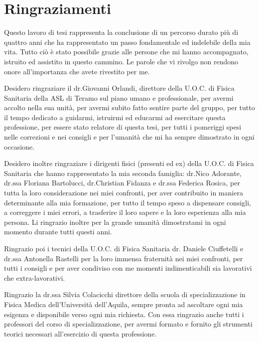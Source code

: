
\chapter*{Ringraziamenti}
Questo lavoro di tesi rappresenta la conclusione di un percorso durato più di quattro anni che ha rappresentato un passo fondamentale ed indelebile della mia vita. Tutto ciò è stato possibile grazie alle persone che mi hanno accompagnato, istruito ed assistito in questo cammino. Le parole che vi rivolgo non rendono onore all'importanza che avete rivestito per me.

\vspace*{2ex}

Desidero ringraziare il dr.Giovanni Orlandi, direttore della U.O.C. di Fisica Sanitaria della ASL di Teramo sul piano umano e professionale, per avermi accolto nella sua unità, per avermi subito fatto sentire parte del gruppo, per tutto il tempo dedicato a guidarmi, istruirmi ed educarmi ad esercitare questa professione, per essere stato relatore di questa tesi, per tutti i pomeriggi spesi nelle correzioni e nei consigli e per l'umanità che mi ha sempre dimostrato in ogni occasione.

\vspace*{2ex}

Desidero inoltre ringraziare i dirigenti fisici (presenti ed ex) della U.O.C. di Fisica Sanitaria che hanno rappresentato la mia seconda famiglia: dr.Nico Adorante, dr.ssa Floriana Bartolucci, dr.Christian Fidanza e dr.ssa Federica Rosica, per tutta la loro considerazione nei miei confronti, per aver contribuito in maniera determinante alla mia formazione, per tutto il tempo speso a dispensare consigli, a correggere i miei errori, a trasferire il loro sapere e la loro esperienza alla mia persona. Li ringrazio inoltre per la grande umanità dimostratami in ogni momento durante tutti questi anni.

\vspace*{2ex}

Ringrazio poi i tecnici della U.O.C. di Fisica Sanitaria dr. Daniele Ciuffetelli e dr.ssa Antonella Rastelli per la loro immensa fraternità nei miei confronti, per tutti i consigli e per aver condiviso con me momenti indimenticabili sia lavorativi che extra-lavorativi.

\vspace*{2ex}

Ringrazio la dr.ssa Silvia Colacicchi direttore della scuola di specializzazione in Fisica Medica dell'Università dell'Aquila, sempre pronta ad ascoltare ogni mia esigenza e disponibile verso ogni mia richiesta. Con essa ringrazio anche tutti i professori del corso di specializzazione, per avermi formato e fornito gli strumenti teorici necessari all'esercizio di questa professione.

